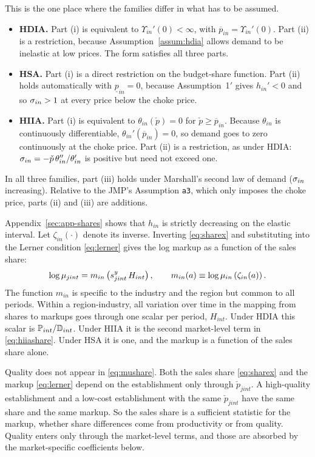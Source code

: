 This is the one place where the families differ in what has to be assumed.
\begin{itemize}
	\item \textbf{HDIA.} Part (i) is equivalent to $\Upsilon_{in}'(0) < \infty$, with $\overline{p}_{in} = \Upsilon_{in}'(0)$. Part (ii) is a restriction, because Assumption~\ref{assum:hdia} allows demand to be inelastic at low prices. The \textcite{Klenow&Willis16} form satisfies all three parts.
	\item \textbf{HSA.} Part (i) is a direct restriction on the budget-share function. Part (ii) holds automatically with $\underline{p}_{in} = 0$, because Assumption~1$'$ gives $h_{in}' < 0$ and so $\s_{in} > 1$ at every price below the choke price.
	\item \textbf{HIIA.} Part (i) is equivalent to $\theta_{in}(\check{p}) = 0$ for $\check{p} \geq \overline{p}_{in}$. Because $\theta_{in}$ is continuously differentiable, $\theta_{in}'(\overline{p}_{in}) = 0$, so demand goes to zero continuously at the choke price. Part (ii) is a restriction, as under HDIA: $\s_{in} = -\check{p}\,\theta_{in}''/\theta_{in}'$ is positive but need not exceed one.
\end{itemize}
In all three families, part (iii) holds under Marshall's second law of demand ($\s_{in}$ increasing).
Relative to the JMP's Assumption \texttt{a3}, which only imposes the choke price, parts (ii) and (iii) are additions.

Appendix~\ref{sec:app-shares} shows that $h_{in}$ is strictly decreasing on the elastic interval.
Let $\zeta_{in}(\cdot)$ denote its inverse.
Inverting \eqref{eq:sharex} and substituting into the Lerner condition \eqref{eq:lerner} gives the log markup as a function of the sales share:
\begin{equation}\label{eq:mushare}
	\log \m_{jint} = m_{in}\left(s^y_{jint} \, H_{int}\right), \qquad m_{in}(a) \equiv \log \m_{in}\left(\zeta_{in}(a)\right).
\end{equation}
The function $m_{in}$ is specific to the industry and the region but common to all periods.
Within a region-industry, all variation over time in the mapping from shares to markups goes through one scalar per period, $H_{int}$.
Under HDIA this scalar is $\P_{int}/\mathbb{D}_{int}$.
Under HIIA it is the second market-level term in \eqref{eq:hiiashare}.
Under HSA it is one, and the markup is a function of the sales share alone.

Quality does not appear in \eqref{eq:mushare}.
Both the sales share \eqref{eq:sharex} and the markup \eqref{eq:lerner} depend on the establishment only through $\check{p}_{jint}$.
A high-quality establishment and a low-cost establishment with the same $\check{p}_{jint}$ have the same share and the same markup.
So the sales share is a sufficient statistic for the markup, whether share differences come from productivity or from quality.
Quality enters only through the market-level terms, and those are absorbed by the market-specific coefficients below.

